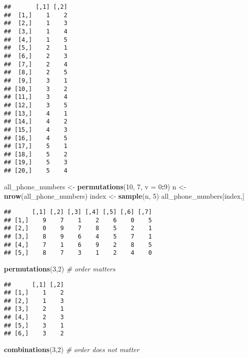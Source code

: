 \documentclass[
]{article}
\newenvironment{Shaded}{\begin{snugshade}}{\end{snugshade}}
\newcommand{\CommentTok}[1]{\textcolor[rgb]{0.56,0.35,0.01}{\textit{#1}}}
\newcommand{\DataTypeTok}[1]{\textcolor[rgb]{0.13,0.29,0.53}{#1}}
\newcommand{\DecValTok}[1]{\textcolor[rgb]{0.00,0.00,0.81}{#1}}
\newcommand{\KeywordTok}[1]{\textcolor[rgb]{0.13,0.29,0.53}{\textbf{#1}}}
\newcommand{\NormalTok}[1]{#1}
\newcommand{\OperatorTok}[1]{\textcolor[rgb]{0.81,0.36,0.00}{\textbf{#1}}}
\newcommand{\StringTok}[1]{\textcolor[rgb]{0.31,0.60,0.02}{#1}}
\begin{document}
\begin{verbatim}
##       [,1] [,2]
##  [1,]    1    2
##  [2,]    1    3
##  [3,]    1    4
##  [4,]    1    5
##  [5,]    2    1
##  [6,]    2    3
##  [7,]    2    4
##  [8,]    2    5
##  [9,]    3    1
## [10,]    3    2
## [11,]    3    4
## [12,]    3    5
## [13,]    4    1
## [14,]    4    2
## [15,]    4    3
## [16,]    4    5
## [17,]    5    1
## [18,]    5    2
## [19,]    5    3
## [20,]    5    4
\end{verbatim}

\begin{Shaded}
\begin{Highlighting}[]
\NormalTok{all\_phone\_numbers \textless{}{-}}\StringTok{ }\KeywordTok{permutations}\NormalTok{(}\DecValTok{10}\NormalTok{, }\DecValTok{7}\NormalTok{, }\DataTypeTok{v =} \DecValTok{0}\OperatorTok{:}\DecValTok{9}\NormalTok{)}
\NormalTok{n \textless{}{-}}\StringTok{ }\KeywordTok{nrow}\NormalTok{(all\_phone\_numbers)}
\NormalTok{index \textless{}{-}}\StringTok{ }\KeywordTok{sample}\NormalTok{(n, }\DecValTok{5}\NormalTok{)}
\NormalTok{all\_phone\_numbers[index,]}
\end{Highlighting}
\end{Shaded}

\begin{verbatim}
##      [,1] [,2] [,3] [,4] [,5] [,6] [,7]
## [1,]    9    7    1    2    6    0    5
## [2,]    0    9    7    8    5    2    1
## [3,]    8    9    6    4    5    7    1
## [4,]    7    1    6    9    2    8    5
## [5,]    8    7    3    1    2    4    0
\end{verbatim}

\begin{Shaded}
\begin{Highlighting}[]
\KeywordTok{permutations}\NormalTok{(}\DecValTok{3}\NormalTok{,}\DecValTok{2}\NormalTok{)    }\CommentTok{\# order matters}
\end{Highlighting}
\end{Shaded}

\begin{verbatim}
##      [,1] [,2]
## [1,]    1    2
## [2,]    1    3
## [3,]    2    1
## [4,]    2    3
## [5,]    3    1
## [6,]    3    2
\end{verbatim}

\begin{Shaded}
\begin{Highlighting}[]
\KeywordTok{combinations}\NormalTok{(}\DecValTok{3}\NormalTok{,}\DecValTok{2}\NormalTok{)    }\CommentTok{\# order does not matter}
\end{Highlighting}
\end{Shaded}
\end{document}
